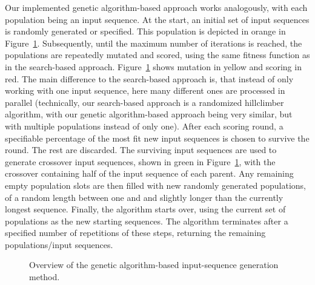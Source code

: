 Our implemented genetic algorithm-based approach works analogously, with each population being an input sequence. At the start, an initial set of input sequences is randomly generated or specified. This population is depicted in orange in Figure~\ref{fig:fuzz_genetic}. Subsequently, until the maximum number of iterations is reached, the populations are repeatedly mutated and scored, using the same fitness function as in the search-based approach. Figure~\ref{fig:fuzz_genetic} shows mutation in yellow and scoring in red. The main difference to the search-based approach is, that instead of only working with one input sequence, here many different ones are processed in parallel (technically, our search-based approach is a randomized hillclimber algorithm, with our genetic algorithm-based approach being very similar, but with multiple populations instead of only one). After each scoring round, a specifiable percentage of the most fit new input sequences is chosen to survive the round. The rest are discarded. The surviving input sequences are used to generate crossover input sequences, shown in green in Figure~\ref{fig:fuzz_genetic}, with the crossover containing half of the input sequence of each parent. Any remaining empty population slots are then filled with new randomly generated populations, of a random length between one and and slightly longer than the currently longest sequence. Finally, the algorithm starts over, using the current set of populations as the new starting sequences. The algorithm terminates after a specified number of repetitions of these steps, returning the remaining populations/input sequences. \\

\begin{figure}[H]
	\begin{centering}
\caption{Overview of the genetic algorithm-based input-sequence generation method.}
\label{fig:fuzz_genetic}
\end{centering}
\end{figure}

